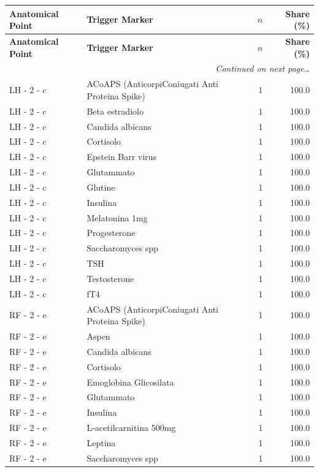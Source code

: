 \documentclass[a4paper,11pt]{article}
\begin{document}
\begin{footnotesize}
\begin{longtable}{p{3.5cm}p{7.5cm}rr}
\toprule
\textbf{Anatomical Point} &
\textbf{Trigger Marker} &
\textbf{$n$} &
\textbf{Share (\%)} \\
\midrule
\endfirsthead
\toprule
\textbf{Anatomical Point} &
\textbf{Trigger Marker} &
\textbf{$n$} &
\textbf{Share (\%)} \\
\midrule
\endhead
\midrule
\multicolumn{4}{r}{\footnotesize\emph{Continued on next page\ldots}} \\
\endfoot
\bottomrule
\endlastfoot
LH - 2 - c & ACoAPS (AnticorpiConiugati Anti Proteina Spike) & 1 & 100.0 \\
LH - 2 - c & Beta estradiolo & 1 & 100.0 \\
LH - 2 - c & Candida albicans & 1 & 100.0 \\
LH - 2 - c & Cortisolo & 1 & 100.0 \\
LH - 2 - c & Epstein Barr virus & 1 & 100.0 \\
LH - 2 - c & Glutammato & 1 & 100.0 \\
LH - 2 - c & Glutine & 1 & 100.0 \\
LH - 2 - c & Insulina & 1 & 100.0 \\
LH - 2 - c & Melatonina 1mg & 1 & 100.0 \\
LH - 2 - c & Progesterone & 1 & 100.0 \\
LH - 2 - c & Saccharomyces spp & 1 & 100.0 \\
LH - 2 - c & TSH & 1 & 100.0 \\
LH - 2 - c & Testosterone & 1 & 100.0 \\
LH - 2 - c & fT4 & 1 & 100.0 \\
RF - 2 - e & ACoAPS (AnticorpiConiugati Anti Proteina Spike) & 1 & 100.0 \\
RF - 2 - e & Aspen & 1 & 100.0 \\
RF - 2 - e & Candida albicans & 1 & 100.0 \\
RF - 2 - e & Cortisolo & 1 & 100.0 \\
RF - 2 - e & Emoglobina Glicosilata & 1 & 100.0 \\
RF - 2 - e & Glutammato & 1 & 100.0 \\
RF - 2 - e & Insulina & 1 & 100.0 \\
RF - 2 - e & L-acetilcarnitina 500mg & 1 & 100.0 \\
RF - 2 - e & Leptina & 1 & 100.0 \\
RF - 2 - e & Saccharomyces spp & 1 & 100.0 \\

\end{longtable}
\end{footnotesize}
\end{document}
